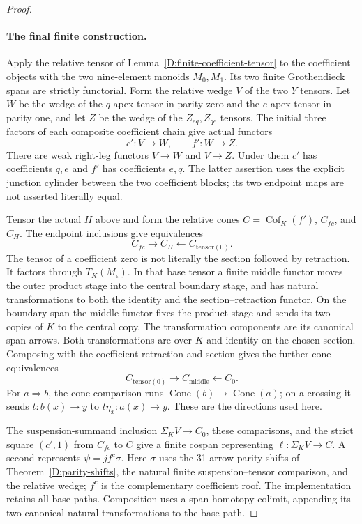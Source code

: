 \begin{proof}
\paragraph{The final finite construction.}
Apply the relative tensor of Lemma~\ref{D:finite-coefficient-tensor}
to the coefficient objects with the two nine-element monoids
$M_0,M_1$. Its two finite Grothendieck spans are strictly
functorial. Form the relative wedge $V$ of the two $Y$ tensors.
Let $W$ be the wedge of the $q$-apex tensor in parity zero and
the $e$-apex tensor in parity one, and let $Z$ be the wedge of
the $Z_{eq},Z_{qe}$ tensors. The initial three factors of each
composite coefficient chain give actual functors
\[
 c':V\longrightarrow W,\qquad f':W\longrightarrow Z.
\]
There are weak right-leg functors $V\to W$ and $V\to Z$.
Under them $c'$ has coefficients $q,e$ and $f'$ has coefficients
$e,q$. The latter assertion uses the explicit junction cylinder
between the two coefficient blocks; its two endpoint maps are
not asserted literally equal.

Tensor the actual $H$ above and form the relative cones
$C=\operatorname{Cof}_K(f')$, $C_{fc}$, and $C_H$.
The endpoint inclusions give equivalences
\[
 C_{fc}\longrightarrow C_H\longleftarrow C_{\mathrm{tensor}(0)}.
\]
The tensor of a coefficient zero is not literally the section
followed by retraction. It factors through $T_K(M_\epsilon)$.
In that base tensor a finite middle functor moves the outer
product stage into the central boundary stage, and has natural
transformations to both the identity and the section--retraction
functor. On the boundary span the middle functor fixes the
product stage and sends its two copies of $K$ to the central
copy. The transformation components are its canonical span
arrows. Both transformations are over $K$ and identity on the
chosen section. Composing with the coefficient retraction and
section gives the further cone equivalences
\[
 C_{\mathrm{tensor}(0)}\longrightarrow C_{\mathrm{middle}}
 \longleftarrow C_0.
\]
For $a\Rightarrow b$, the cone comparison runs
$\operatorname{Cone}(b)\to\operatorname{Cone}(a)$; on a crossing
it sends $t:b(x)\to y$ to $t\eta_x:a(x)\to y$.
These are the directions used here.

The suspension-summand inclusion $\Sigma_KV\to C_0$, these
comparisons, and the strict square $(c',1)$ from $C_{fc}$ to $C$
give a finite cospan representing $\ell:\Sigma_KV\to C$.
A second represents $\psi=jf^c\sigma$. Here $\sigma$ uses the
31-arrow parity shifts of Theorem~\ref{D:parity-shifts}, the
natural finite suspension--tensor comparison, and the relative
wedge; $f^c$ is the complementary coefficient roof.
The implementation retains all base paths. Composition uses
a span homotopy colimit, appending its two canonical natural
transformations to the base path.


\end{proof}
